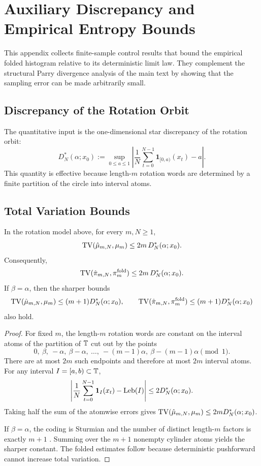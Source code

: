 \section{Auxiliary Discrepancy and Empirical Entropy Bounds}
\label{app:discrepancy}

This appendix collects finite-sample control results that bound the empirical
folded histogram relative to its deterministic limit law. They complement the
structural Parry divergence analysis of the main text by showing that the
sampling error can be made arbitrarily small.

\subsection{Discrepancy of the Rotation Orbit}

The quantitative input is the one-dimensional star discrepancy of the
rotation orbit:
\[
D_N^*(\alpha;x_0)
:=
\sup_{0\le a\le 1}
\left|
\frac{1}{N}\sum_{t=0}^{N-1}\mathbf{1}_{[0,a)}(x_t)-a
\right|.
\]
This quantity is effective because length-$m$ rotation words are determined by a
finite partition of the circle into interval atoms.

\subsection{Total Variation Bounds}

\begin{theorem}\label{thm:tv-certificate-hist}
In the rotation model above, for every $m,N\ge 1$,
\[
\operatorname{TV}(\hat\mu_{m,N},\mu_m)\le 2m\,D_N^*(\alpha;x_0).
\]
Consequently,
\[
\operatorname{TV}(\hat\pi_{m,N},\pi_m^{\mathrm{fold}})
\le
2m\,D_N^*(\alpha;x_0).
\]
If \(\beta=\alpha\), then the sharper bounds
\[
\operatorname{TV}(\hat\mu_{m,N},\mu_m)\le (m+1)D_N^*(\alpha;x_0),
\qquad
\operatorname{TV}(\hat\pi_{m,N},\pi_m^{\mathrm{fold}})\le (m+1)D_N^*(\alpha;x_0)
\]
also hold.
\end{theorem}

\begin{proof}
For fixed $m$, the length-$m$ rotation words are constant on the interval atoms
of the partition of \(\mathbb{T}\) cut out by the points
\[
0,\ \beta,\ -\alpha,\ \beta-\alpha,\ \dots,\ -(m-1)\alpha,\ \beta-(m-1)\alpha
\pmod 1.
\]
There are at most \(2m\) such endpoints and therefore at most \(2m\) interval
atoms. For any interval \(I=[a,b)\subset\mathbb{T}\),
\[
\left|
\frac{1}{N}\sum_{t=0}^{N-1}\mathbf{1}_I(x_t)-\mathrm{Leb}(I)
\right|
\le
2D_N^*(\alpha;x_0).
\]
Taking half the sum of the atomwise errors gives
\(\operatorname{TV}(\hat\mu_{m,N},\mu_m)\le 2mD_N^*(\alpha;x_0)\).

If \(\beta=\alpha\), the coding is Sturmian and the number of distinct
length-\(m\) factors is exactly \(m+1\)
\cite{MorseHedlund1940,LindMarcus1995}. Summing over the \(m+1\) nonempty
cylinder atoms yields the sharper constant. The folded estimates follow because
deterministic pushforward cannot increase total variation.
\end{proof}

